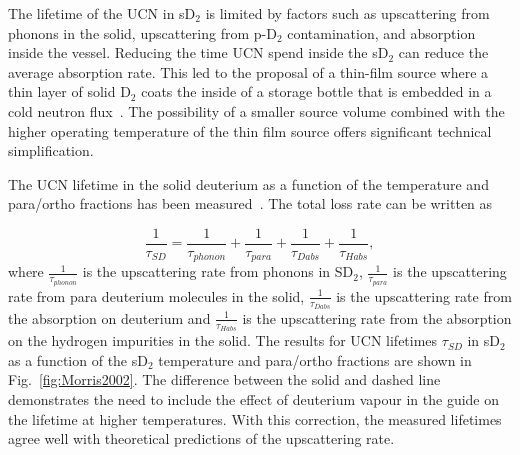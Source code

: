 The lifetime of the UCN in sD$_2$ is limited by factors such as
upscattering from phonons in the solid, upscattering from p-D$_2$
contamination, and absorption inside the vessel.  Reducing the time UCN
spend inside the sD$_2$ can reduce the average absorption rate. This
led to the proposal of a thin-film source where a thin layer of solid
D$_2$ coats the inside of a storage bottle that is embedded in a cold
neutron flux~\cite{Golub83}. The possibility of a smaller source
volume combined with the higher operating temperature of the thin film
source offers significant technical simplification.

The UCN lifetime in the solid deuterium as a function of the temperature
and para/ortho fractions has been measured~\cite{Morris2002}. The
total loss rate can be written as

\begin{equation}
\label{eqn:SD_lifetime}
\frac{1}{\tau_{SD}}=\frac{1}{\tau_{phonon}}+\frac{1}{\tau_{para}}+\frac{1}{\tau_{Dabs}}+ \frac{1}{\tau_{Habs}},
\end{equation}
where $\frac{1}{\tau_{phonon}}$ is the upscattering rate from phonons
in SD$_2$, $\frac{1}{\tau_{para}}$ is the upscattering rate from para
deuterium molecules in the solid, $\frac{1}{\tau_{Dabs}}$ is the
upscattering rate from the absorption on deuterium and
$\frac{1}{\tau_{Habs}}$ is the upscattering rate from the absorption
on the hydrogen impurities in the solid. The results for UCN lifetimes
$\tau_{SD}$ in sD$_2$ as a function of the sD$_2$ temperature and
para/ortho fractions are shown in Fig.~\ref{fig:Morris2002}. The
difference between the solid and dashed line demonstrates the need to
include the effect of deuterium vapour in the guide on the lifetime at
higher temperatures. With this correction, the measured lifetimes
agree well with theoretical predictions of the upscattering rate.







